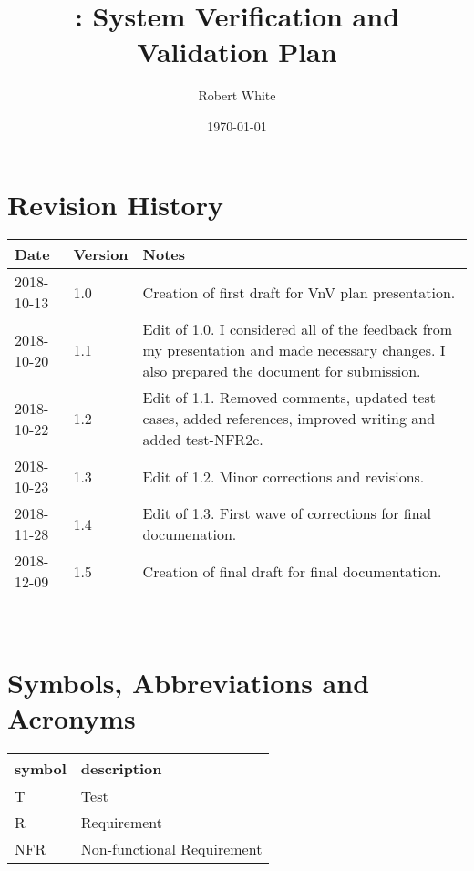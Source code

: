 \documentclass[12pt, titlepage]{article}
\begin{document}
\title{\progname: System Verification and Validation Plan} 
\author{Robert White}
\date{\today}
	
\maketitle


\section{Revision History}

\begin{tabularx}{\textwidth}{p{3cm}p{2cm}X}
\toprule {\bf Date} & {\bf Version} & {\bf Notes}\\
\midrule
2018-10-13 & 1.0 & Creation of first draft for VnV plan presentation.\\
2018-10-20 & 1.1 & Edit of 1.0. I considered all of the feedback from my 
presentation and made necessary changes. I also prepared the document for 
submission. \\ 
2018-10-22 & 1.2 & Edit of 1.1. Removed comments, updated test cases, added 
references, improved writing and added test-NFR2c. \\ 
2018-10-23 & 1.3 & Edit of 1.2. Minor corrections and revisions. \\
2018-11-28 & 1.4 & Edit of 1.3. First wave of corrections for final 
documenation.\\ 
2018-12-09 & 1.5 & Creation of final draft for final documentation. \\
\bottomrule
\end{tabularx}

~\newpage

\section{Symbols, Abbreviations and Acronyms}

\renewcommand{\arraystretch}{1.2}
\begin{tabular}{l l} 
  \toprule		
  \textbf{symbol} & \textbf{description}\\
  \midrule 
  T & Test\\
  R & Requirement\\ 
  NFR & Non-functional Requirement\\
  \bottomrule
\end{tabular}\\
\end{document}

